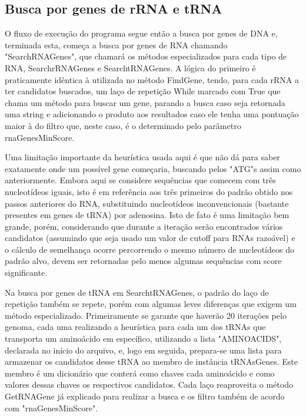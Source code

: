 \documentclass[brazilian,12pt,a4paper,final]{article}
\begin{document}
\subsection{Busca por genes de rRNA e tRNA}

O fluxo de execução do programa segue então a busca por genes de DNA e, terminada esta, começa a busca por genes de RNA chamando "SearchRNAGenes", que chamará os métodos especializados para cada tipo de RNA, SearchrRNAGenes e SearchtRNAGenes. A lógica do primeiro é praticamente idêntica à utilizada no método FindGene, tendo, para cada rRNA a ter candidatos buscados, um laço de repetição While marcado com True que chama um método para buscar um gene, parando a busca caso seja retornada uma string e adicionando o produto aos resultados caso ele tenha uma pontuação maior à do filtro que, neste caso, é o determinado pelo parâmetro rnaGenesMinScore. 

\vspace{0.5cm}

Uma limitação importante da heurística usada aqui é que não dá para saber
exatamente onde um possível gene começaria, buscando pelos "ATG"s assim como anteriormente. Embora aqui se considere sequências que comecem com três nucleotídeos iguais, isto é em referência aos três primeiros do padrão obtido nos passos anteriores do RNA, substituindo nucleotídeos inconvencionais (bastante presentes em genes de tRNA) por adenosina. Isto de fato é uma limitação bem grande, porém, considerando que durante a iteração serão encontrados vários candidatos (assumindo que seja usado um valor de cutoff para RNAs razoável) e o cálculo de semelhança ocorre percorrendo o mesmo número de nucleotídeos do padrão alvo, devem ser retornadas pelo menos algumas sequências com score significante. 

\vspace{0.5cm}

Na busca por genes de tRNA em SearchtRNAGenes, o padrão do laço de repetição também se repete, porém com algumas leves diferenças que exigem um método especializado. Primeiramente se garante que haverão 20 iterações pelo genoma, cada uma realizando a heurística para cada um dos tRNAs que transporta um aminoácido em específico, utilizando a lista "AMINOACIDS", declarada no início do arquivo, e, logo em seguida, prepara-se uma lista para armazenar os candidatos desse tRNA ao membro de instância tRNAsGenes. Este membro é um dicionário que conterá como chaves cada aminoácido e como valores dessas chaves os respectivos candidatos. Cada laço reaproveita o método GetRNAGene já explicado para realizar a busca e os filtro também de acordo com "rnaGenesMinScore".
\end{document}
